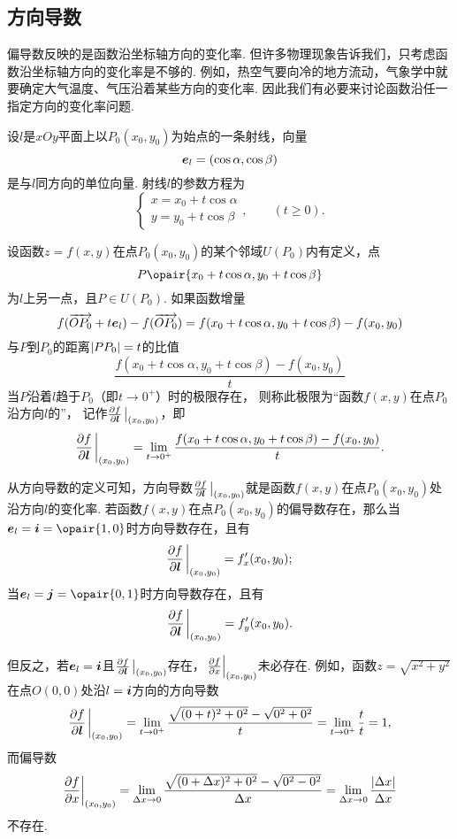 \subsection{方向导数}
偏导数反映的是函数沿坐标轴方向的变化率.
但许多物理现象告诉我们，只考虑函数沿坐标轴方向的变化率是不够的.
例如，热空气要向冷的地方流动，气象学中就要确定大气温度、气压沿着某些方向的变化率.
因此我们有必要来讨论函数沿任一指定方向的变化率问题.

\begin{definition}
设\(l\)是\(xOy\)平面上以\(P_0(x_0,y_0)\)为始点的一条射线，向量\[
	\boldsymbol{e}_l=(\cos\alpha,\cos\beta)
\]是与\(l\)同方向的单位向量.
射线\(l\)的参数方程为\[
\left\{ \begin{array}{l}
x=x_0+t\cos\alpha \\
y=y_0+t\cos\beta
\end{array} \right., \qquad (t \geq 0).
\]

设函数\(z=f(x,y)\)在点\(P_0(x_0,y_0)\)的某个邻域\(U(P_0)\)内有定义，点\[
P\opair{x_0+t\cos\alpha,y_0+t\cos\beta}
\]为\(l\)上另一点，且\(P \in U(P_0)\).
如果函数增量\[
f(\overrightarrow{O P_0} + t \boldsymbol{e}_l) - f(\overrightarrow{O P_0})
= f(x_0+t\cos\alpha,y_0+t\cos\beta)-f(x_0,y_0)
\]与\(P\)到\(P_0\)的距离\(\abs{PP_0}=t\)的比值\[
\frac{f(x_0+t\cos\alpha,y_0+t\cos\beta)-f(x_0,y_0)}{t}
\]当\(P\)沿着\(l\)趋于\(P_0\)（即\(t\to0^+\)）时的极限存在，
则称此极限为“函数\(f(x,y)\)在点\(P_0\)沿方向\(l\)的”，
记作\(\pdv{f}{\mat{l}}\eval_{(x_0,y_0)}\)，即\[
\pdv{f}{\mat{l}}\eval_{(x_0,y_0)}
=\lim\limits_{t\to0^+} \frac{f(x_0+t\cos\alpha,y_0+t\cos\beta)-f(x_0,y_0)}{t}.
\]
\end{definition}

从方向导数的定义可知，方向导数\(\pdv{f}{\mat{l}}\eval_{(x_0,y_0)}\)就是函数\(f(x,y)\)在点\(P_0(x_0,y_0)\)处沿方向\(l\)的变化率.
若函数\(f(x,y)\)在点\(P_0(x_0,y_0)\)的偏导数存在，那么当\(\mat{e}_l = \mat{i} = \opair{1,0}\)时方向导数存在，且有\[
\pdv{f}{\mat{l}}\eval_{(x_0,y_0)} = f'_x(x_0,y_0);
\]当\(\mat{e}_l = \mat{j} = \opair{0,1}\)时方向导数存在，且有\[
\pdv{f}{\mat{l}}\eval_{(x_0,y_0)} = f'_y(x_0,y_0).
\]

但反之，若\(\boldsymbol{e}_l = \boldsymbol{i}\)且\(\pdv{f}{\mat{l}}\eval_{(x_0,y_0)}\)存在，\(\eval{\pdv{f}{x}}_{(x_0,y_0)}\)未必存在.
例如，函数\(z = \sqrt{x^2+y^2}\)在点\(O(0,0)\)处沿\(l = \boldsymbol{i}\)方向的方向导数\[
\pdv{f}{\mat{l}}\eval_{(x_0,y_0)}
= \lim\limits_{t\to0^+} \frac{\sqrt{(0+t)^2+0^2}-\sqrt{0^2+0^2}}{t}
= \lim\limits_{t\to0^+} \frac{t}{t} = 1,
\]而偏导数\[
\eval{\pdv{f}{x}}_{(x_0,y_0)}
= \lim\limits_{\increment x\to0} \frac{\sqrt{(0+\increment x)^2+0^2}-\sqrt{0^2-0^2}}{\increment x}
= \lim\limits_{\increment x\to0} \frac{\abs{\increment x}}{\increment x}
\]不存在.

